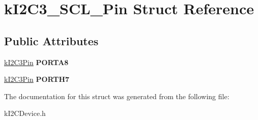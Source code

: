 \hypertarget{structkI2C3__SCL__Pin}{}\section{k\+I2\+C3\+\_\+\+S\+C\+L\+\_\+\+Pin Struct Reference}
\label{structkI2C3__SCL__Pin}
\subsection*{Public Attributes}
\begin{DoxyCompactItemize}
\item 
\hyperlink{structkI2C3Pin}{k\+I2\+C3\+Pin} {\bfseries P\+O\+R\+T\+A8}\hypertarget{structkI2C3__SCL__Pin_a14949c3931d045ef7307658ca6be2fb8}{}\label{structkI2C3__SCL__Pin_a14949c3931d045ef7307658ca6be2fb8}

\item 
\hyperlink{structkI2C3Pin}{k\+I2\+C3\+Pin} {\bfseries P\+O\+R\+T\+H7}\hypertarget{structkI2C3__SCL__Pin_a8d579234046c306a14b93a4f1878c0e9}{}\label{structkI2C3__SCL__Pin_a8d579234046c306a14b93a4f1878c0e9}

\end{DoxyCompactItemize}


The documentation for this struct was generated from the following file\+:\begin{DoxyCompactItemize}
\item 
k\+I2\+C\+Device.\+h\end{DoxyCompactItemize}
